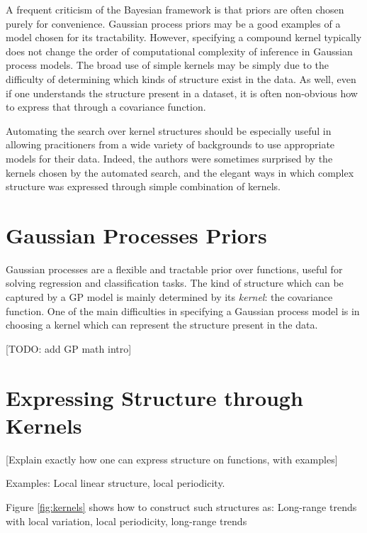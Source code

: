 \documentclass[twoside]{article}
\begin{document}
A frequent criticism of the Bayesian framework is that priors are often chosen purely for convenience.
Gaussian process priors may be a good examples of a model chosen for its tractability.
However, specifying a compound kernel typically does not change the order of computational complexity of inference in Gaussian process models.
The broad use of simple kernels may be simply due to the difficulty of determining which kinds of structure exist in the data.
As well, even if one understands the structure present in a dataset, it is often non-obvious how to express that through a covariance function.

Automating the search over kernel structures should be especially useful in allowing pracitioners from a wide variety of backgrounds to use appropriate models for their data.
Indeed, the authors were sometimes surprised by the kernels chosen by the automated search, and the elegant ways in which complex structure was expressed through simple combination of kernels.


\section{Gaussian Processes Priors}

Gaussian processes are a flexible and tractable prior over functions, useful for solving regression and classification tasks\cite{rasmussen38gaussian}.
The kind of structure which can be captured by a GP model is mainly determined by its \emph{kernel}: the covariance function.
One of the main difficulties in specifying a Gaussian process model is in choosing a kernel which can represent the structure present in the data.

[TODO: add GP math intro]

\section{Expressing Structure through Kernels}



[Explain exactly how one can express structure on functions, with examples]

Examples: Local linear structure, local periodicity.

Figure \ref{fig:kernels} shows how to construct such structures as:  Long-range trends with local variation, local periodicity, long-range trends 
\end{document}
